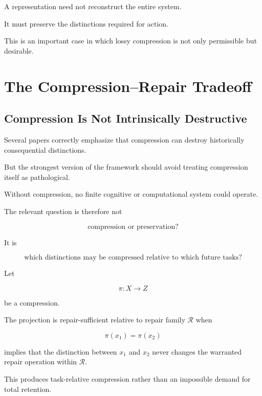 \documentclass[11pt]{article}
\theoremstyle{remark}
\begin{document}
A representation need not reconstruct the entire system.

It must preserve the distinctions required for action.

This is an important case in which lossy compression is not only permissible but desirable.

\section{The Compression--Repair Tradeoff}

\subsection{Compression Is Not Intrinsically Destructive}

Several papers correctly emphasize that compression can destroy historically consequential distinctions.

But the strongest version of the framework should avoid treating compression itself as pathological.

Without compression, no finite cognitive or computational system could operate.

The relevant question is therefore not

\begin{equation}
\text{compression or preservation?}
\end{equation}

It is

\begin{equation}
\text{which distinctions may be compressed relative to which future tasks?}
\end{equation}

Let

\begin{equation}
\pi:X\rightarrow Z
\end{equation}

be a compression.

The projection is repair-sufficient relative to repair family $\mathcal{R}$ when

\begin{equation}
\pi(x_1)=\pi(x_2)
\end{equation}

implies that the distinction between $x_1$ and $x_2$ never changes the warranted repair operation within $\mathcal{R}$.

This produces task-relative compression rather than an impossible demand for total retention.
\end{document}
